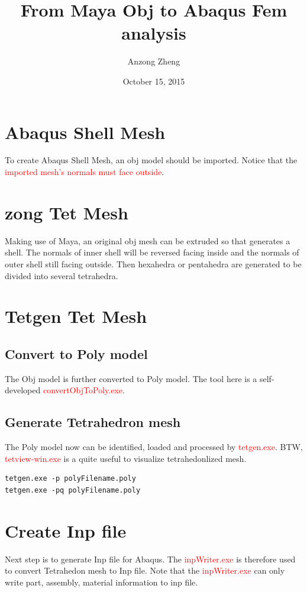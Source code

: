 \documentclass[10pt,a4paper]{article}
\begin{document}
\author{Anzong Zheng}
\title{From Maya Obj to Abaqus Fem analysis}
\date{October 15, 2015}
\maketitle
\newpage

\section{Abaqus Shell Mesh}
To create Abaqus Shell Mesh, an obj model should be imported. Notice that the \textcolor{red}{imported mesh's normals must face outside}.

\section{zong Tet Mesh}
Making use of Maya, an original obj mesh can be extruded so that generates a shell. The normals of inner shell will be reversed facing inside and the normals of outer shell still facing outside. Then hexahedra or pentahedra are generated to be divided into several tetrahedra.

\section{Tetgen Tet Mesh}
\subsection{Convert to Poly model}
The Obj model is further converted to Poly model. The tool here is a self-developed \textcolor{red}{convertObjToPoly.exe}.

\subsection{Generate Tetrahedron mesh}  
The Poly model now can be identified, loaded and processed by \textcolor{red}{tetgen.exe}. BTW, \textcolor{red}{tetview-win.exe} is a quite useful to visualize tetrahedonlized mesh.

\begin{lstlisting}
tetgen.exe -p polyFilename.poly
tetgen.exe -pq polyFilename.poly
\end{lstlisting}

\section{Create Inp file}
Next step is to generate Inp file for Abaqus. The \textcolor{red}{inpWriter.exe} is therefore used to convert Tetrahedon mesh to Inp file. Note that the \textcolor{red}{inpWriter.exe} can only write part, assembly, material information to inp file.
\end{document}
